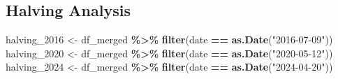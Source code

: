 \documentclass[
]{article}
\newenvironment{Shaded}{\begin{snugshade}}{\end{snugshade}}
\newcommand{\FunctionTok}[1]{\textcolor[rgb]{0.13,0.29,0.53}{\textbf{#1}}}
\newcommand{\NormalTok}[1]{#1}
\newcommand{\OtherTok}[1]{\textcolor[rgb]{0.56,0.35,0.01}{#1}}
\newcommand{\SpecialCharTok}[1]{\textcolor[rgb]{0.81,0.36,0.00}{\textbf{#1}}}
\newcommand{\StringTok}[1]{\textcolor[rgb]{0.31,0.60,0.02}{#1}}
\begin{document}
\hypertarget{halving-analysis}{%
\subsection{Halving Analysis}\label{halving-analysis}}

\begin{Shaded}
\begin{Highlighting}[]
\NormalTok{halving\_2016 }\OtherTok{\textless{}{-}}\NormalTok{ df\_merged }\SpecialCharTok{\%\textgreater{}\%} \FunctionTok{filter}\NormalTok{(date }\SpecialCharTok{==} \FunctionTok{as.Date}\NormalTok{(}\StringTok{"2016{-}07{-}09"}\NormalTok{))}
\NormalTok{halving\_2020 }\OtherTok{\textless{}{-}}\NormalTok{ df\_merged }\SpecialCharTok{\%\textgreater{}\%} \FunctionTok{filter}\NormalTok{(date }\SpecialCharTok{==} \FunctionTok{as.Date}\NormalTok{(}\StringTok{"2020{-}05{-}12"}\NormalTok{))}
\NormalTok{halving\_2024 }\OtherTok{\textless{}{-}}\NormalTok{ df\_merged }\SpecialCharTok{\%\textgreater{}\%} \FunctionTok{filter}\NormalTok{(date }\SpecialCharTok{==} \FunctionTok{as.Date}\NormalTok{(}\StringTok{"2024{-}04{-}20"}\NormalTok{))}
\end{Highlighting}
\end{Shaded}
\end{document}
